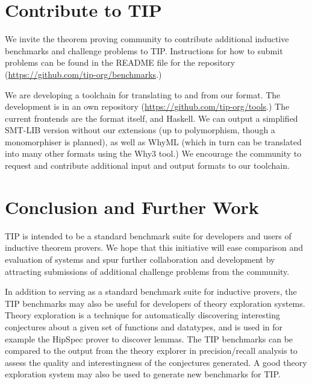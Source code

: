 \documentclass{llncs}
\begin{document}
\section{Contribute to TIP}
We invite the theorem proving community to contribute additional inductive
benchmarks and challenge problems to TIP. Instructions for how to submit
problems can be found in the README file for the repository
(\url{https://github.com/tip-org/benchmarks}.)

We are developing a toolchain for translating to and from our format.  The
development is in an own repository (\url{https://github.com/tip-org/tools}.)
The current frontends are the format itself, and Haskell.  We can output a
simplified SMT-LIB version without our extensions (up to polymorphism, though a
monomorphiser is planned), as well as WhyML\cite{Why3} (which in turn can be
translated into many other formats using the Why3 tool.) We encourage the community
to request and contribute additional input and output formats to our toolchain.

\section{Conclusion and Further Work}
TIP is intended to be a standard benchmark suite for developers and users of inductive theorem provers. We hope that this initiative will ease comparison and evaluation of systems and spur further collaboration and development by attracting submissions of additional challenge problems from the community.

In addition to serving as a standard benchmark suite for inductive provers, the TIP benchmarks may also be useful for developers of theory exploration systems. Theory exploration is a technique for automatically discovering interesting conjectures about a given set of functions and datatypes, and is used in for example the HipSpec prover to discover lemmas. The TIP benchmarks can be compared to the output from the theory explorer in precision/recall analysis to assess the quality and interestingness of the conjectures generated. A good theory exploration system may also be used to generate new benchmarks for TIP.
\end{document}
